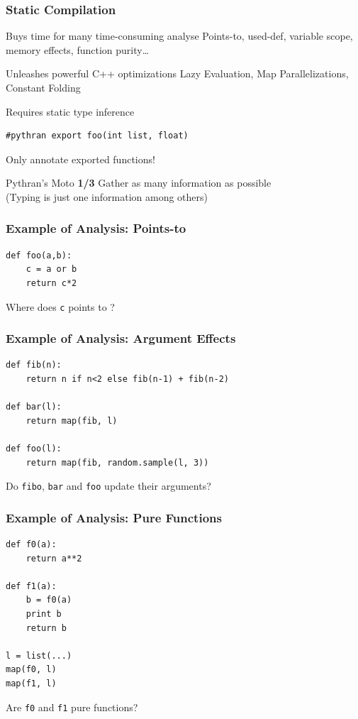 \documentclass[aspectratio=1610]{beamer}
\begin{document}
\begin{frame}[fragile]
    \frametitle{Static Compilation}
    \begin{block}{Buys time for many time-consuming analyse}
        Points-to, used-def, variable scope, memory effects, function purity\dots
    \end{block}
    \begin{block}{Unleashes powerful C++ optimizations}
        Lazy Evaluation, Map Parallelizations, Constant Folding
    \end{block}
    \begin{block}{Requires static type inference}
        \begin{lstlisting}[lang=python]
        #pythran export foo(int list, float)
        \end{lstlisting}
        \centering Only annotate exported functions!
    \end{block}
\end{frame}

\begin{frame}{Pythran's Moto \textbf{1/3}}
\Large\centering Gather as many information as possible\\
\vfill
\normalsize(Typing is just one information among others)\\
\end{frame}


\begin{frame}[fragile]
    \frametitle{Example of Analysis: Points-to}
    \begin{lstlisting}[lang=python]
def foo(a,b):
    c = a or b
    return c*2
    \end{lstlisting}
    \vfill
    \centering\Large Where does \lstinline|c| points to ?
\end{frame}

\begin{frame}[fragile]
    \frametitle{Example of Analysis: Argument Effects}
    \begin{lstlisting}[lang=python]
def fib(n):
    return n if n<2 else fib(n-1) + fib(n-2)

def bar(l):
    return map(fib, l)

def foo(l):
    return map(fib, random.sample(l, 3))
    \end{lstlisting}
    \vfill
    \centering\Large Do \texttt{fibo}, \texttt{bar} and \texttt{foo} update their arguments?
\end{frame}

\begin{frame}[fragile]
    \frametitle{Example of Analysis: Pure Functions}
    \begin{lstlisting}[lang=python]
def f0(a):
    return a**2

def f1(a):
    b = f0(a)
    print b
    return b

l = list(...)
map(f0, l)
map(f1, l)
    \end{lstlisting}
    \vfill\centering\Large Are \texttt{f0} and \texttt{f1} pure functions?
\end{frame}
\end{document}
